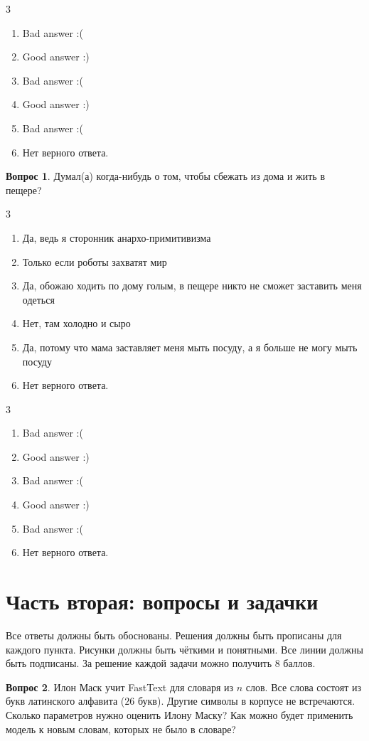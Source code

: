 \documentclass[12pt]{article}
\newenvironment{answerlist}[1][3]{
\begin{multicols}{#1}

\begin{enumerate}[label=\fbox{\emph{\Alph*}},ref=\emph{\alph*}]
}
{
\item Нет верного ответа.
\end{enumerate}
\end{multicols}
}
\theoremstyle{definition}
\newtheorem{question}{Вопрос}
\begin{document}
\begin{solution}
\begin{answerlist}
  \item Bad answer :(
  \item Good answer :)
  \item Bad answer :(
  \item Good answer :)
  \item Bad answer :(
\end{answerlist}
\end{solution}



\begin{question}
Думал(а) когда-нибудь о том, чтобы сбежать из дома и жить в пещере?
\begin{answerlist}
  \item Да, ведь я сторонник анархо-примитивизма
  \item Только если роботы захватят мир
  \item Да, обожаю ходить по дому голым, в пещере никто не сможет заставить меня одеться
  \item Нет, там холодно и сыро
  \item Да, потому что мама заставляет меня мыть посуду, а я больше не могу мыть посуду
\end{answerlist}
\end{question}

\begin{solution}
\begin{answerlist}
  \item Bad answer :(
  \item Good answer :)
  \item Bad answer :(
  \item Good answer :)
  \item Bad answer :(
\end{answerlist}
\end{solution}

\newpage 

\section*{Часть вторая: вопросы и задачки}

Все ответы должны быть обоснованы. Решения должны быть прописаны для каждого пункта. Рисунки должны быть чёткими и понятными. Все линии должны быть подписаны. За решение каждой задачи можно получить 8 баллов.

\begin{question}
    Илон Маск учит FastText для словаря из $n$ слов. Все слова состоят из букв латинского алфавита ($26$ букв). Другие символы в корпусе не встречаются. Сколько параметров нужно оценить Илону Маску? Как можно будет применить модель к новым словам, которых не было в словаре?
\end{question}
\end{document}
